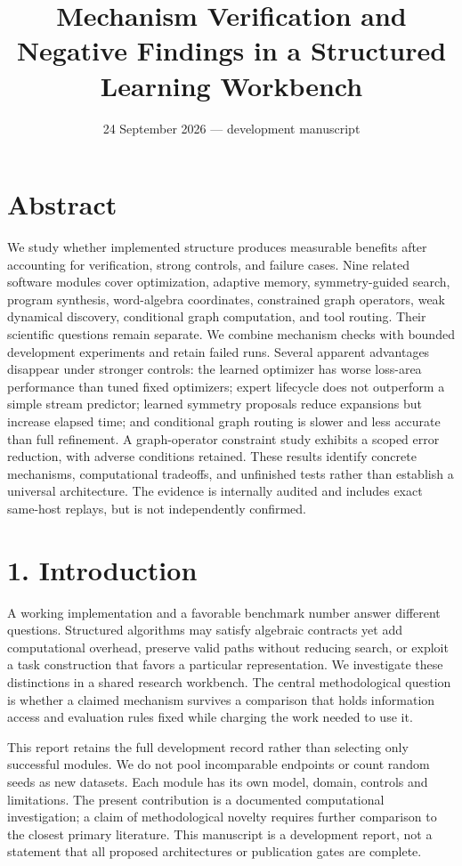 \documentclass[
]{article}
\title{Mechanism Verification and Negative Findings in a Structured
Learning Workbench}
\author{}
\date{24 September 2026 --- development manuscript}
\begin{document}
\maketitle

\section{Abstract}\label{abstract}

We study whether implemented structure produces measurable benefits
after accounting for verification, strong controls, and failure cases.
Nine related software modules cover optimization, adaptive memory,
symmetry-guided search, program synthesis, word-algebra coordinates,
constrained graph operators, weak dynamical discovery, conditional graph
computation, and tool routing. Their scientific questions remain
separate. We combine mechanism checks with bounded development
experiments and retain failed runs. Several apparent advantages
disappear under stronger controls: the learned optimizer has worse
loss-area performance than tuned fixed optimizers; expert lifecycle does
not outperform a simple stream predictor; learned symmetry proposals
reduce expansions but increase elapsed time; and conditional graph
routing is slower and less accurate than full refinement. A
graph-operator constraint study exhibits a scoped error reduction, with
adverse conditions retained. These results identify concrete mechanisms,
computational tradeoffs, and unfinished tests rather than establish a
universal architecture. The evidence is internally audited and includes
exact same-host replays, but is not independently confirmed.

\section{1. Introduction}\label{introduction}

A working implementation and a favorable benchmark number answer
different questions. Structured algorithms may satisfy algebraic
contracts yet add computational overhead, preserve valid paths without
reducing search, or exploit a task construction that favors a particular
representation. We investigate these distinctions in a shared research
workbench. The central methodological question is whether a claimed
mechanism survives a comparison that holds information access and
evaluation rules fixed while charging the work needed to use it.

This report retains the full development record rather than selecting
only successful modules. We do not pool incomparable endpoints or count
random seeds as new datasets. Each module has its own model, domain,
controls and limitations. The present contribution is a documented
computational investigation; a claim of methodological novelty requires
further comparison to the closest primary literature. This manuscript is
a development report, not a statement that all proposed architectures or
publication gates are complete.
\end{document}
